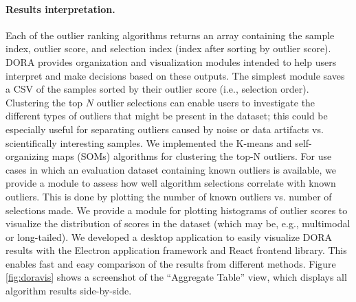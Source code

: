 \documentclass[letterpaper]{article} %
\begin{document}
\paragraph{Results interpretation.}
Each of the outlier ranking algorithms returns an array containing the sample
index, outlier score, and selection index (index after sorting
by outlier score). DORA provides organization and visualization modules
intended to help users interpret and make decisions based on these outputs.
The simplest
 module saves a CSV of the samples sorted by their outlier score 
 (i.e., selection order). Clustering the top
  $N$ outlier selections can enable users to investigate the different types of 
 outliers that might be present in the dataset; this could be especially useful
 for separating outliers caused by noise or data artifacts vs. scientifically 
 interesting samples. We implemented the K-means and self-organizing maps 
 (SOMs) algorithms for clustering the top-N outliers. For use cases in which an
 evaluation dataset containing known outliers is available, we provide a module
 to assess how well algorithm selections correlate with known outliers. This is
 done by plotting the number of known outliers vs. number of selections made. 
We provide a module for plotting histograms of outlier scores to visualize the
 distribution of scores in the dataset (which may be, e.g., multimodal or 
 long-tailed). 
We developed a desktop application to easily visualize DORA results with the
Electron application framework and React frontend library. 
This enables fast and easy comparison of the results from
different methods. Figure \ref{fig:doravis} shows a screenshot of the
``Aggregate Table'' view, which displays all algorithm results 
side-by-side.

\end{document}
